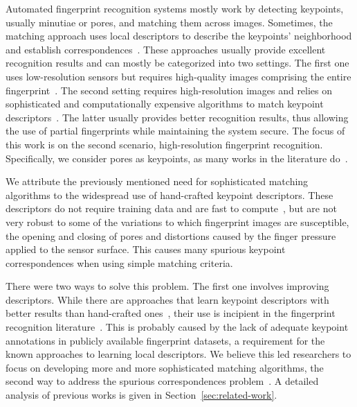 \documentclass[10pt,twocolumn,letterpaper]{article}
\begin{document}
Automated fingerprint recognition systems mostly work by detecting keypoints, usually minutiae or pores, and matching them across images.
Sometimes, the matching approach uses local descriptors to describe the keypoints' neighborhood and establish correspondences~\cite{jain-latent,direct-pore,ridge-reconstruction}.
These approaches usually provide excellent recognition results and can mostly be categorized into two settings.
The first one uses low-resolution sensors but requires high-quality images comprising the entire fingerprint~\cite{jain-pores-and-ridges,ridge-reconstruction}.
The second setting requires high-resolution images and relies on sophisticated and computationally expensive algorithms to match keypoint descriptors~\cite{ridge-reconstruction,su-pores-deep,td-sparse}.
The latter usually provides better recognition results, thus allowing the use of partial fingerprints while maintaining the system secure.
The focus of this work is on the second scenario, high-resolution fingerprint recognition.
Specifically, we consider pores as keypoints, as many works in the literature do~\cite{direct-pore, ridge-reconstruction, td-sparse, feature-guided, su-pores-deep}.

We attribute the previously mentioned need for sophisticated matching algorithms to the widespread use of hand-crafted keypoint descriptors.
These descriptors do not require training data and are fast to compute~\cite{direct-pore,ridge-reconstruction}, but are not very robust to some of the variations to which fingerprint images are susceptible, \eg the opening and closing of pores and distortions caused by the finger pressure applied to the sensor surface.
This causes many spurious keypoint correspondences when using simple matching criteria.

There were two ways to solve this problem.
The first one involves improving descriptors.
While there are approaches that learn keypoint descriptors with better results than hand-crafted ones~\cite{l2net,hardnet,doap}, their use is incipient in the fingerprint recognition literature~\cite{jain-latent, zhang-pattern-rec}.
This is probably caused by the lack of adequate keypoint annotations in publicly available fingerprint datasets, a requirement for the known approaches to learning local descriptors.
We believe this led researchers to focus on developing more and more sophisticated matching algorithms, the second way to address the spurious correspondences problem~\cite{td-sparse, ridge-reconstruction, feature-guided}.
A detailed analysis of previous works is given in Section~\ref{sec:related-work}.
\end{document}

